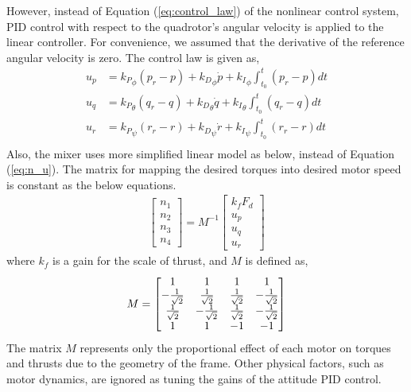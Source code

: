 However, instead of Equation (\ref{eq:control_law}) of the nonlinear control system, PID control with respect to the quadrotor's angular velocity is applied to the linear controller. For convenience, we assumed that the derivative of the reference angular velocity is zero. The control law is given as,\\
\begin{equation}
\begin{aligned}
{u_p} & = {{k_P}_{\phi}}(p_r - {p}) + {{k_D}_{\phi}}{\dot {p}} + {{k_I}_{\phi}} \int_{t_0}^{t} {(p_r - {p})} dt\\
{u_q} & = {{k_P}_{\theta}}(q_r - {q}) + {{k_D}_{\theta}}{\dot {q}} + {{k_I}_{\theta}} \int_{t_0}^{t} {(q_r - {q})} dt\\
{u_r} & = {{k_P}_{\psi}}(r_r - {r}) + {{k_D}_{\psi}}{\dot {r}} + {{k_I}_{\psi}} \int_{t_0}^{t} {(r_r - {r})} dt\\
\end{aligned}
\end{equation}
Also, the mixer uses more simplified linear model as below, instead of Equation (\ref{eq:n_u}). The matrix for mapping the desired torques into desired motor speed is constant as the below equations.
\begin{equation}
\begin{aligned}
\begin{bmatrix}
n_1\\
n_2\\
n_3\\
n_4
\end{bmatrix}
= M^{-1}
\begin{bmatrix}
k_f F_d\\
u_p\\
u_q\\
u_r
\end{bmatrix}
\end{aligned}
\end{equation}
where \(k_f\) is a gain for the scale of thrust, and \(M\) is defined as, \\
\begin{equation}
\begin{aligned}
M = 
\begin{bmatrix}
1 				& 1				& 1				& 1 \\
- {1\over{\sqrt{2}}}	&   {1\over{\sqrt{2}}}	& {1\over{\sqrt{2}}}	& - {1\over{\sqrt{2}}} \\
  {1\over{\sqrt{2}}}	& - {1\over{\sqrt{2}}}	& {1\over{\sqrt{2}}}	& - {1\over{\sqrt{2}}} \\
1				& 1				& - 1				& -1\\
\end{bmatrix}
\end{aligned}
\end{equation}
The matrix \(M\) represents only the proportional effect of each motor on torques and thrusts due to the geometry of the frame. Other physical factors, such as motor dynamics, are ignored as tuning the gains of the attitude PID control.





